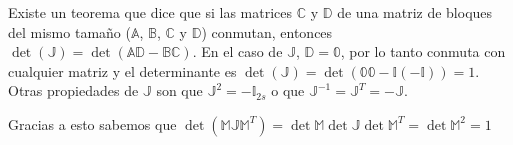 Existe un teorema que dice que si las matrices $\mathbb{C}$ y $\mathbb{D}$ de una matriz de bloques del mismo tamaño ($\mathbb{A}$, $\mathbb{B}$, $\mathbb{C}$ y $\mathbb{D}$) conmutan, entonces $\det{(\mathbb{J})} = \det{(\mathbb{A}\mathbb{D}-\mathbb{B}\mathbb{C})}$. En el caso de $\mathbb{J}$, $\mathbb{D}= \mathbb{0}$, por lo tanto conmuta con cualquier matriz y el determinante es $\det{(\mathbb{J})} = \det{(\mathbb{0}\mathbb{0}-\mathbb{I}(-\mathbb{I}))} = 1$. Otras propiedades de $\mathbb{J}$ son que $\mathbb{J}^2 = -\mathbb{I}_{2s}$ o que $\mathbb{J}^{-1} = \mathbb{J}^T = -\mathbb{J}$.

Gracias a esto sabemos que $\det{(\mathbb{M}\mathbb{J} \mathbb{M}^T)} = \det{\mathbb{M}} \det{\mathbb{J}} \det{\mathbb{M}^T}=\det{\mathbb{M}}^2 = 1$
